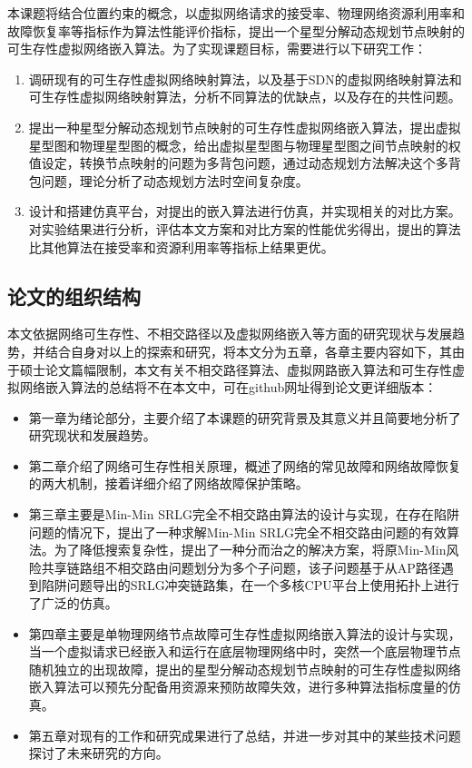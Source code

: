 本课题将结合位置约束的概念，以虚拟网络请求的接受率、物理网络资源利用率和故障恢复率等指标作为算法性能评价指标，提出一个星型分解动态规划节点映射的可生存性虚拟网络嵌入算法。为了实现课题目标，需要进行以下研究工作：
\begin{enumerate}
  \item 调研现有的可生存性虚拟网络映射算法，以及基于SDN的虚拟网络映射算法和可生存性虚拟网络映射算法，分析不同算法的优缺点，以及存在的共性问题。
  \item 提出一种星型分解动态规划节点映射的可生存性虚拟网络嵌入算法，提出虚拟星型图和物理星型图的概念，给出虚拟星型图与物理星型图之间节点映射的权值设定，转换节点映射的问题为多背包问题，通过动态规划方法解决这个多背包问题，理论分析了动态规划方法时空间复杂度。
  \item 设计和搭建仿真平台，对提出的嵌入算法进行仿真，并实现相关的对比方案。对实验结果进行分析，评估本文方案和对比方案的性能优劣得出，提出的算法比其他算法在接受率和资源利用率等指标上结果更优。
\end{enumerate}

\subsection{论文的组织结构}
本文依据网络可生存性、不相交路径以及虚拟网络嵌入等方面的研究现状与发展趋势，并结合自身对以上的探索和研究，将本文分为五章，各章主要内容如下，其由于硕士论文篇幅限制，本文有关不相交路径算法、虚拟网路嵌入算法和可生存性虚拟网络嵌入算法的总结将不在本文中，可在github网址\cite{Thesis}得到论文更详细版本：
\begin{itemize}
  \item 第一章为绪论部分，主要介绍了本课题的研究背景及其意义并且简要地分析了研究现状和发展趋势。
  \item 第二章介绍了网络可生存性相关原理，概述了网络的常见故障和网络故障恢复的两大机制，接着详细介绍了网络故障保护策略。
  \item 第三章主要是Min-Min SRLG完全不相交路由算法的设计与实现，在存在陷阱问题的情况下，提出了一种求解Min-Min SRLG完全不相交路由问题的有效算法。为了降低搜索复杂性，提出了一种分而治之的解决方案，将原Min-Min风险共享链路组不相交路由问题划分为多个子问题，该子问题基于从AP路径遇到陷阱问题导出的SRLG冲突链路集，在一个多核CPU平台上使用拓扑上进行了广泛的仿真。
  \item 第四章主要是单物理网络节点故障可生存性虚拟网络嵌入算法的设计与实现，当一个虚拟请求已经嵌入和运行在底层物理网络中时，突然一个底层物理节点随机独立的出现故障，提出的星型分解动态规划节点映射的可生存性虚拟网络嵌入算法可以预先分配备用资源来预防故障失效，进行多种算法指标度量的仿真。
  \item 第五章对现有的工作和研究成果进行了总结，并进一步对其中的某些技术问题探讨了未来研究的方向。
\end{itemize}
